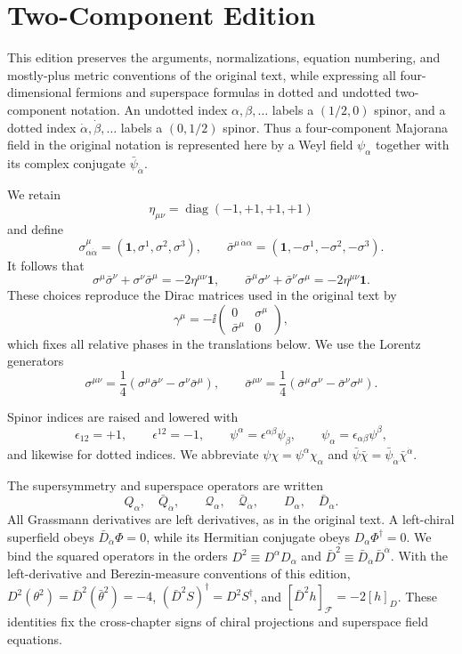 \section*{Two-Component Edition}

This edition preserves the arguments, normalizations, equation numbering,
and mostly-plus metric conventions of the original text, while expressing
all four-dimensional fermions and superspace formulas in dotted and
undotted two-component notation.  An undotted index
\(\alpha,\beta,\ldots\) labels a \((1/2,0)\) spinor, and a dotted index
\(\dot\alpha,\dot\beta,\ldots\) labels a \((0,1/2)\) spinor.  Thus a
four-component Majorana field in the original notation is represented here
by a Weyl field \(\psi_\alpha\) together with its complex conjugate
\(\bar\psi_{\dot\alpha}\).

We retain
\[
  \eta_{\mu\nu}=\operatorname{diag}(-1,+1,+1,+1)
\]
and define
\[
  \sigma^\mu_{\alpha\dot\alpha}
  =(\mathbf{1},\sigma^1,\sigma^2,\sigma^3),
  \qquad
  \bar\sigma^{\mu\,\dot\alpha\alpha}
  =(\mathbf{1},-\sigma^1,-\sigma^2,-\sigma^3).
\]
It follows that
\[
  \sigma^\mu\bar\sigma^\nu+\sigma^\nu\bar\sigma^\mu
  =-2\eta^{\mu\nu}\mathbf{1},
  \qquad
  \bar\sigma^\mu\sigma^\nu+\bar\sigma^\nu\sigma^\mu
  =-2\eta^{\mu\nu}\mathbf{1}.
\]
These choices reproduce the Dirac matrices used in the original text by
\[
  \gamma^\mu=-\ii
  \begin{pmatrix}
    0&\sigma^\mu\\
    \bar\sigma^\mu&0
  \end{pmatrix},
\]
which fixes all relative phases in the translations below.
We use the Lorentz generators
\[
  \sigma^{\mu\nu}
  =\frac14(\sigma^\mu\bar\sigma^\nu-\sigma^\nu\bar\sigma^\mu),
  \qquad
  \bar\sigma^{\mu\nu}
  =\frac14(\bar\sigma^\mu\sigma^\nu-\bar\sigma^\nu\sigma^\mu).
\]

Spinor indices are raised and lowered with
\[
  \epsilon_{12}=+1,\qquad
  \epsilon^{12}=-1,\qquad
  \psi^\alpha=\epsilon^{\alpha\beta}\psi_\beta,\qquad
  \psi_\alpha=\epsilon_{\alpha\beta}\psi^\beta,
\]
and likewise for dotted indices.  We abbreviate
\(\psi\chi=\psi^\alpha\chi_\alpha\) and
\(\bar\psi\bar\chi
=\bar\psi_{\dot\alpha}\bar\chi^{\dot\alpha}\).

The supersymmetry and superspace operators are written
\[
  Q_\alpha,\quad\bar Q_{\dot\alpha},\qquad
  \mathcal Q_\alpha,\quad\bar{\mathcal Q}_{\dot\alpha},\qquad
  D_\alpha,\quad\bar D_{\dot\alpha}.
\]
All Grassmann derivatives are left derivatives, as in the original text.
A left-chiral superfield obeys
\(\bar D_{\dot\alpha}\Phi=0\), while its Hermitian conjugate obeys
\(D_\alpha\Phi^\dagger=0\).
We bind the squared operators in the orders
\(D^2\equiv D^\alpha D_\alpha\) and
\(\bar D^2\equiv\bar D_{\dot\alpha}\bar D^{\dot\alpha}\).  With the
left-derivative and Berezin-measure conventions of this edition,
\(D^2(\theta^2)=\bar D^2(\bar\theta^2)=-4\),
\((\bar D^2S)^\dagger=D^2S^\dagger\), and
\([\bar D^2h]_{\mathcal F}=-2[h]_D\).  These identities fix the
cross-chapter signs of chiral projections and superspace field equations.


